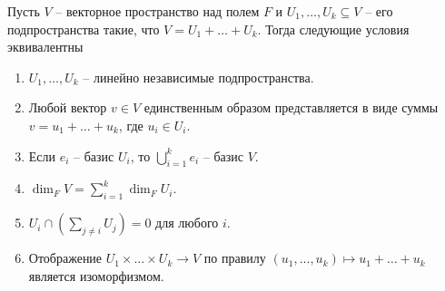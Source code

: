 \begin{claim}
\label{claim::DirectSum}
Пусть $V$ -- векторное пространство над полем $F$ и $U_1,\ldots,U_k \subseteq V$ -- его подпространства такие, что $V = U_1+\ldots + U_k$.
Тогда следующие условия эквивалентны
\begin{enumerate}
\item $U_1,\ldots,U_k$ -- линейно независимые подпространства.

\item Любой вектор $v\in V$ единственным образом представляется в виде суммы $v = u_1 + \ldots + u_k$, где $u_i \in U_i$.

\item Если $e_i$ -- базис $U_i$, то $\bigcup_{i=1}^k e_i$ -- базис $V$.

\item $\dim_F V = \sum_{i=1}^k \dim_F U_i$.

\item $U_i \cap (\sum_{j\neq i}U_j) = 0$ для любого $i$.

\item Отображение $U_1\times \ldots \times U_k\to V$ по правилу $(u_1,\ldots,u_k)\mapsto u_1 + \ldots + u_k$ является изоморфизмом.

\end{enumerate}
\end{claim}

